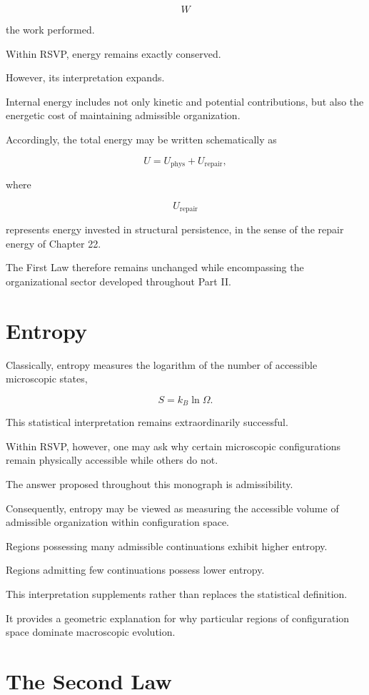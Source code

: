 \documentclass[11pt,oneside]{book}
\numberwithin{equation}{chapter}
\theoremstyle{definition}
\theoremstyle{plain}
\begin{document}
\[
W
\]

the work performed.

Within RSVP, energy remains exactly conserved.

However, its interpretation expands.

Internal energy includes not only kinetic and potential contributions, but
also the energetic cost of maintaining admissible organization.

Accordingly, the total energy may be written schematically as

\[
U
=
U_{\mathrm{phys}}
+
U_{\mathrm{repair}},
\]

where

\[
U_{\mathrm{repair}}
\]

represents energy invested in structural persistence, in the sense of the
repair energy of Chapter 22.

The First Law therefore remains unchanged while encompassing the
organizational sector developed throughout Part II.

\section{Entropy}

Classically, entropy measures the logarithm of the number of accessible
microscopic states,

\[
S
=
k_B
\ln\Omega.
\]

This statistical interpretation remains extraordinarily successful.

Within RSVP, however, one may ask why certain microscopic configurations
remain physically accessible while others do not.

The answer proposed throughout this monograph is admissibility.

Consequently, entropy may be viewed as measuring the accessible volume of
admissible organization within configuration space.

Regions possessing many admissible continuations exhibit higher entropy.

Regions admitting few continuations possess lower entropy.

This interpretation supplements rather than replaces the statistical
definition.

It provides a geometric explanation for why particular regions of
configuration space dominate macroscopic evolution.

\section{The Second Law}
\end{document}
